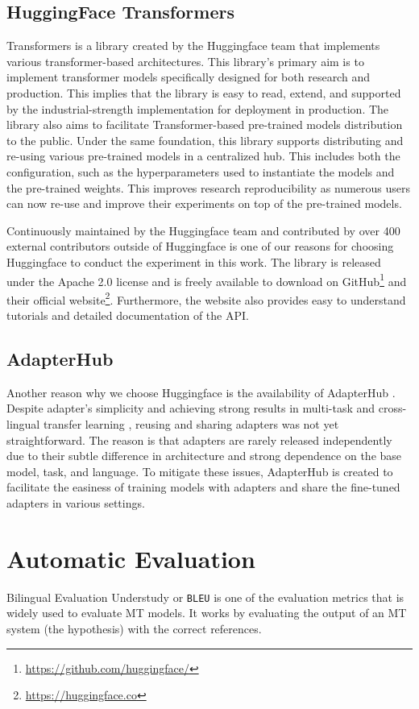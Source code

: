\subsection{HuggingFace Transformers}
Transformers \cite{wolf2020transformers} is a library created by the Huggingface team that implements various transformer-based architectures. This library's primary aim is to implement transformer models specifically designed for both research and production. This implies that the library is easy to read, extend, and supported by the industrial-strength implementation for deployment in production. The library also aims to facilitate Transformer-based pre-trained models distribution to the public. Under the same foundation, this library supports distributing and re-using various pre-trained models in a centralized hub. This includes both the configuration, such as the hyperparameters used to instantiate the models and the pre-trained weights. This improves research reproducibility as numerous users can now re-use and improve their experiments on top of the pre-trained models.

Continuously maintained by the Huggingface team and contributed by over 400 external contributors outside of Huggingface is one of our reasons for choosing Huggingface to conduct the experiment in this work. The library is released under the Apache 2.0 license and is freely available to download on GitHub\footnote{\url{https://github.com/huggingface/}} and their official website\footnote{\url{https://huggingface.co}}. Furthermore, the website also provides easy to understand tutorials and detailed documentation of the API.

\subsection{AdapterHub}
Another reason why we choose Huggingface is the availability of AdapterHub \cite{pfeiffer-etal-2020-adapterhub}. Despite adapter's simplicity and achieving strong results in multi-task and cross-lingual transfer learning \cite{pfeiffer2021adapterfusion,pfeiffer2020madx}, reusing and sharing adapters was not yet straightforward. The reason is that adapters are rarely released independently due to their subtle difference in architecture and strong dependence on the base model, task, and language. To mitigate these issues, AdapterHub is created to facilitate the easiness of training models with adapters and share the fine-tuned adapters in various settings.

\section{Automatic Evaluation}
\label{sec:aeval}
Bilingual Evaluation Understudy or \texttt{BLEU} \cite{BLEU} is one of the evaluation metrics that is widely used to evaluate MT models. It works by evaluating the output of an MT system (the hypothesis) with the correct references.

